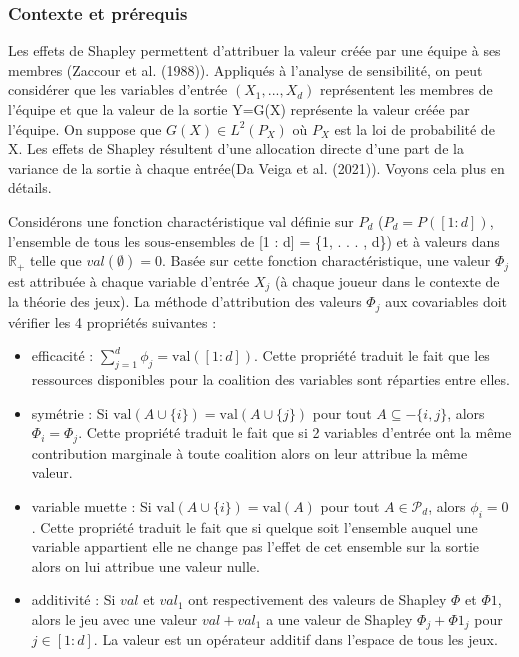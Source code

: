 \documentclass[
]{article}
\begin{document}
\hypertarget{contexte-et-pruxe9requis}{%
\subsubsection{Contexte et prérequis}\label{contexte-et-pruxe9requis}}

Les effets de Shapley permettent d'attribuer la valeur créée par une
équipe à ses membres (Zaccour et al. (1988)). Appliqués à l'analyse de
sensibilité, on peut considérer que les variables d'entrée
\((X_1, ..., X_d)\) représentent les membres de l'équipe et que la
valeur de la sortie Y=G(X) représente la valeur créée par l'équipe. On
suppose que \(G(X) \in L^2(P_X)\) où \(P_X\) est la loi de probabilité
de X. Les effets de Shapley résultent d'une allocation directe d'une
part de la variance de la sortie à chaque entrée(Da Veiga et al.
(2021)). Voyons cela plus en détails.

Considérons une fonction charactéristique val définie sur \(P_d\)
(\(P_d = P([1 : d])\), l'ensemble de tous les sous-ensembles de {[}1 :
d{]} = \{1, . . . , d\}) et à valeurs dans \(\mathbb{R}_+\) telle que
\(val(\emptyset)=0\). Basée sur cette fonction charactéristique, une
valeur \(\Phi_j\) est attribuée à chaque variable d'entrée \(X_j\) (à
chaque joueur dans le contexte de la théorie des jeux). La méthode
d'attribution des valeurs \(\Phi_j\) aux covariables doit vérifier les 4
propriétés suivantes :

\begin{itemize}
\item
  efficacité : \(\sum_{j=1}^{d} \phi_j = \text{val}([1 : d])\). Cette
  propriété traduit le fait que les ressources disponibles pour la
  coalition des variables sont réparties entre elles.
\item
  symétrie : Si \(\text{val}(A \cup \{i\}) = \text{val}(A \cup \{j\})\)
  pour tout \(A \subseteq -\{i, j\}\), alors \(\Phi_i = \Phi_j\). Cette
  propriété traduit le fait que si 2 variables d'entrée ont la même
  contribution marginale à toute coalition alors on leur attribue la
  même valeur.
\item
  variable muette : Si \(\text{val}(A \cup \{i\}) = \text{val}(A)\) pour
  tout \(A \in \mathcal{P}_d\), alors \(\phi_i = 0\). Cette propriété
  traduit le fait que si quelque soit l'ensemble auquel une variable
  appartient elle ne change pas l'effet de cet ensemble sur la sortie
  alors on lui attribue une valeur nulle.
\item
  additivité : Si \(val\) et \(val_1\) ont respectivement des valeurs de
  Shapley \(\Phi\) et \(\Phi1\), alors le jeu avec une valeur
  \(val + val_1\) a une valeur de Shapley \(\Phi_j + \Phi1_{j}\) pour
  \(j \in [1 : d]\). La valeur est un opérateur additif dans l'espace de
  tous les jeux.
\end{itemize}
\end{document}
